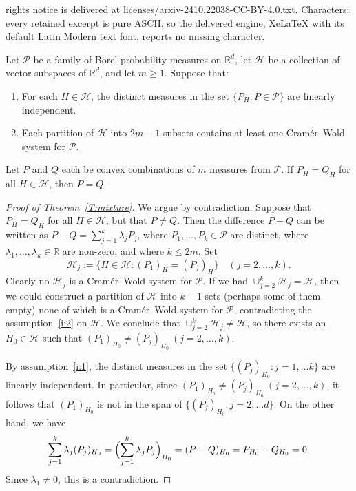 \documentclass[10pt,a4paper]{amsart}
\newcommand{\RR}{\mathbb{R}}
\newcommand{\cH}{\mathcal{H}}
\newcommand{\cP}{\mathcal{P}}
\begin{document}
rights notice is delivered at licenses/arxiv-2410.22038-CC-BY-4.0.txt. Characters: every retained excerpt is pure ASCII, so the delivered engine, XeLaTeX with its default Latin Modern text font, reports no missing character.
\begin{theorem}\label{T:mixture}
Let $\cP$ be a family of Borel probability measures on $\RR^d$,
let $\cH$ be a collection of vector subspaces of $\RR^d$, and let $m\ge1$.
Suppose that:
\begin{enumerate}[\normalfont\rm(i)]
\item\label{i:1} 
For each $H\in\cH$, the distinct measures in the set
$\{P_H:P\in\cP\}$ are linearly independent.
\item\label{i:2} 
Each partition of $\cH$ into $2m-1$ subsets contains at least one Cram\'er--Wold system for $\cP$.
\end{enumerate}
Let $P$ and $Q$ each be convex combinations of $m$ measures from $\cP$.
If $P_H=Q_H$ for all $H\in\cH$, then $P=Q$.
\end{theorem}

\begin{proof}[Proof of Theorem~\ref{T:mixture}]
We argue by contradiction. 
Suppose that $P_H=Q_H$ for all $H\in\cH$, but that $P\ne Q$. 
Then the difference $P-Q$ can be written as 
$P-Q=\sum_{j=1}^k\lambda_j P_j$, 
where $P_1,\dots,P_k\in\cP$ are distinct,  
where $\lambda_1,\dots,\lambda_k\in\RR$  are non-zero,
and where $k\le 2m$. Set
\[
\cH_j:=\{H\in\cH: (P_{1})_H= (P_{j})_H\} \quad(j=2,\dots,k).
\]
Clearly no $\cH_j$ is a Cram\'er--Wold system for $\cP$.
If we had $\cup_{j=2}^k \cH_j=\cH$, then we could construct a partition
of $\cH$ into $k-1$ sets (perhaps some of them empty) none of which is
a Cram\'er--Wold system for $\cP$, contradicting the assumption~\eqref{i:2}
on $\cH$.
We conclude that $\cup_{j=2}^k \cH_j\ne\cH$, so there exists an $H_0\in\cH$
such that $(P_{1})_{H_0}\ne (P_{j})_{H_0}~(j=2,\dots,k)$.
		
By assumption~\eqref{i:1},
the distinct measures in the set $\{(P_j)_{H_0}:j=1,\dots k\}$
are linearly independent. In particular, since $(P_{1})_{H_0}\ne (P_{j})_{H_0}~(j=2,\dots,k)$,
it follows that $(P_{1})_{H_0}$ is not in the span of $\{(P_j)_{H_0}:j=2,\dots d\}$. 
On the other hand, we have
\[
\sum_{j=1}^k\lambda_j(P_j)_{H_0}
=\Bigl(\sum_{j=1}^k\lambda_j P_j\Bigr)_{H_0}=(P-Q)_{H_0}=P_{H_0}-Q_{H_0}=0.
\]
Since $\lambda_1\ne0$, this is a contradiction.
\end{proof}
\end{document}
